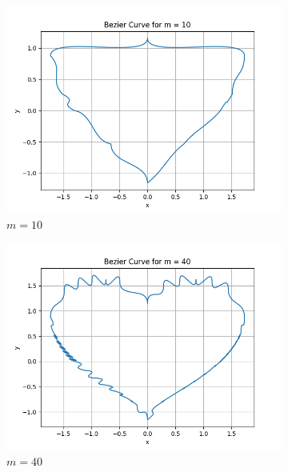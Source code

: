\documentclass[a4paper]{article}
\begin{document}
\begin{figure}[htbp]
    \centering
    \begin{subfigure}[b]{0.32 \textwidth}
        \includegraphics[width=\textwidth]{../results/Task_F/Task_F_m_10.png}
        \caption{$m = 10$}
    \end{subfigure}
    \hfill
    \begin{subfigure}[b]{0.32 \textwidth}
        \includegraphics[width=\textwidth]{../results/Task_F/Task_F_m_40.png}
        \caption{$m = 40$}
    \end{subfigure}
    \hfill
    \begin{subfigure}[b]{0.32 \textwidth}

\end{subfigure}
\end{figure}
\end{document}
